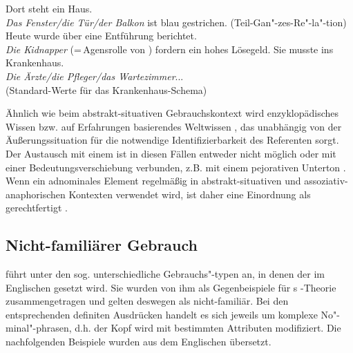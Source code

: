\begin{exe}
	\ex \label{ex:asso3}   
	\begin{xlist}
		\ex \label{ex:meronymie} Dort steht ein  Haus. \\ \textit{Das Fenster/die Tür/der Balkon} ist blau gestrichen. (Teil-Gan"-zes-Re"-la"-tion)
		\ex \label{ex:rolle} Heute wurde über eine Entführung berichtet. \\ \textit{Die Kidnapper} (=\,Agensrolle  von ) fordern ein hohes Lösegeld.
				\ex \label{ex:krank} Sie musste ins Krankenhaus. \\ \textit{Die Ärzte/die Pfleger/das Wartezimmer}...\\(Standard-Werte für das Krankenhaus-Schema)
		\end{xlist}
\end{exe}

Ähnlich wie beim abstrakt-situativen  Gebrauchskontext wird enzyklopädisches Wissen bzw. auf Erfahrungen basierendes Weltwissen , das unabhängig von der Äußerungssituation für die notwendige Identifizierbarkeit des Referenten sorgt. Der Austausch mit einem  ist in diesen Fällen entweder nicht möglich oder mit einer Bedeutungsverschiebung verbunden, z.B. mit einem pejorativen Unterton \parencite[989]{Hauenschild1993}. Wenn ein adnominales Element regelmäßig in abstrakt-situativen  und assoziativ-anaphorischen  Kontexten verwendet wird, ist daher eine Einordnung als  gerechtfertigt \parencite[190]{Himmelmann1997}.\pagebreak

\subsection{Nicht-familiärer Gebrauch}\label{sec:nicht-fam}

\textcite[130--149]{Hawkins1978} führt unter den sog.  unterschiedliche Gebrauchs"-typen an, in denen der  im Englischen gesetzt wird. Sie wurden von ihm als Gegenbeispiele für \citeauthor{Christophersen1939}s -Theorie zusammengetragen und gelten deswegen als nicht-familiär. Bei den entsprechenden definiten Ausdrücken handelt es sich jeweils um komplexe  No"-minal"-phrasen, d.h. der Kopf wird mit bestimmten Attributen modifiziert. Die nachfolgenden Beispiele \parencite[vgl. die Übersicht in][37]{Himmelmann1997} wurden aus dem Englischen übersetzt.
 
